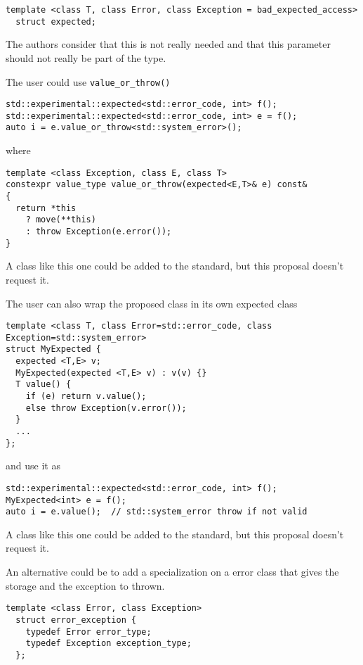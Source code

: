 \documentclass[a4paper,10pt]{article}
\newcommand{\cpp}[1]{\lstinline{#1}}
\begin{document}
\begin{lstlisting}
template <class T, class Error, class Exception = bad_expected_access>
  struct expected;
\end{lstlisting}

\noindent
The authors consider that this is not really needed and that this parameter should not really be part of the type.

The user could use \cpp{value_or_throw()} 

\begin{lstlisting}
std::experimental::expected<std::error_code, int> f();
std::experimental::expected<std::error_code, int> e = f();
auto i = e.value_or_throw<std::system_error>();  
\end{lstlisting}

\noindent
where 

\begin{lstlisting}
template <class Exception, class E, class T>
constexpr value_type value_or_throw(expected<E,T>& e) const&
{
  return *this
    ? move(**this)
    : throw Exception(e.error());
}
\end{lstlisting}

\noindent
A class like this one could be added to the standard, but this proposal doesn't request it. 

The user can also wrap the proposed class in its own expected class

\begin{lstlisting}
template <class T, class Error=std::error_code, class Exception=std::system_error>
struct MyExpected {
  expected <T,E> v;
  MyExpected(expected <T,E> v) : v(v) {}
  T value() {  
    if (e) return v.value();
    else throw Exception(v.error());
  }
  ...
};
\end{lstlisting}

\noindent
and use it as

\begin{lstlisting}
std::experimental::expected<std::error_code, int> f();
MyExpected<int> e = f();
auto i = e.value();  // std::system_error throw if not valid
\end{lstlisting}

\noindent
A class like this one could be added to the standard, but this proposal doesn't request it. 

An alternative could be to add a specialization on a error class that gives the storage and the exception to thrown.

\begin{lstlisting}
template <class Error, class Exception>
  struct error_exception {
    typedef Error error_type;
    typedef Exception exception_type;
  };
\end{lstlisting}
\end{document}
